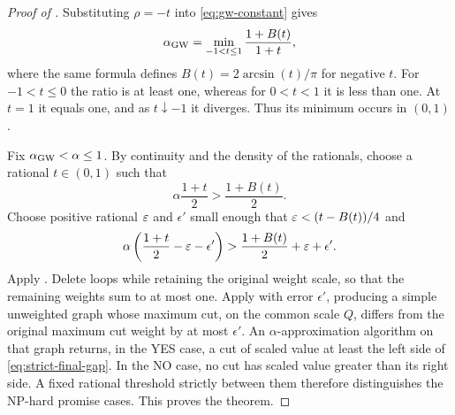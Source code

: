 \begin{proof}[Proof of ]
Substituting $\rho=-t$ into \eqref{eq:gw-constant} gives
\begin{equation}\label{eq:gw-ratio}
 \alpha_{\mathrm{GW}}=\min_{-1<t\le1}\frac{1+B(t)}{1+t},
\end{equation}
where the same formula defines $B(t)=2\arcsin(t)/\pi$ for negative $t$.
For $-1<t\le0$ the ratio is at least one, whereas for $0<t<1$ it is
less than one. At $t=1$ it equals one, and as $t\downarrow-1$ it
diverges. Thus its minimum occurs in $(0,1)$.

Fix $\alpha_{\mathrm{GW}}<\alpha\le1$. By continuity and the density of the rationals,
choose a rational $t\in(0,1)$ such that
\[
 \alpha\frac{1+t}{2}>\frac{1+B(t)}{2}.
\]
Choose positive rational $\varepsilon$ and $\epsilon'$ small enough that
$\varepsilon<(t-B(t))/4$ and
\begin{equation}\label{eq:strict-final-gap}
 \alpha\left(\frac{1+t}{2}-\varepsilon-\epsilon'\right)
 >\frac{1+B(t)}{2}+\varepsilon+\epsilon'.
\end{equation}
Apply . Delete loops while retaining the original weight
scale, so that the remaining weights sum to at most one. Apply
 with error $\epsilon'$, producing a simple
unweighted graph whose maximum cut, on the common scale $Q$, differs
from the original maximum cut weight by at most $\epsilon'$.
An $\alpha$-approximation algorithm on that graph returns, in the YES
case, a cut of scaled value at least the left side of
\eqref{eq:strict-final-gap}. In the NO case, no cut has scaled value
greater than its right side. A fixed rational threshold strictly between them therefore
distinguishes the NP-hard promise cases. This proves the theorem.
\end{proof}
